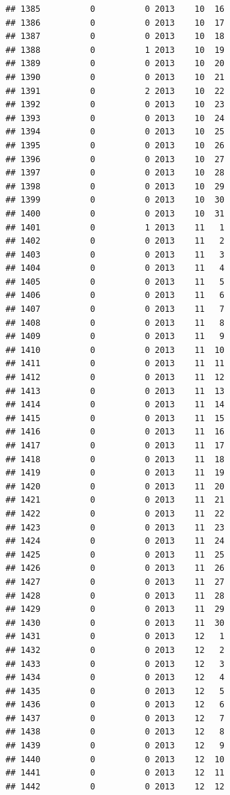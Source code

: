 \documentclass[
]{article}
\begin{document}
\begin{verbatim}
## 1385          0          0 2013    10  16
## 1386          0          0 2013    10  17
## 1387          0          0 2013    10  18
## 1388          0          1 2013    10  19
## 1389          0          0 2013    10  20
## 1390          0          0 2013    10  21
## 1391          0          2 2013    10  22
## 1392          0          0 2013    10  23
## 1393          0          0 2013    10  24
## 1394          0          0 2013    10  25
## 1395          0          0 2013    10  26
## 1396          0          0 2013    10  27
## 1397          0          0 2013    10  28
## 1398          0          0 2013    10  29
## 1399          0          0 2013    10  30
## 1400          0          0 2013    10  31
## 1401          0          1 2013    11   1
## 1402          0          0 2013    11   2
## 1403          0          0 2013    11   3
## 1404          0          0 2013    11   4
## 1405          0          0 2013    11   5
## 1406          0          0 2013    11   6
## 1407          0          0 2013    11   7
## 1408          0          0 2013    11   8
## 1409          0          0 2013    11   9
## 1410          0          0 2013    11  10
## 1411          0          0 2013    11  11
## 1412          0          0 2013    11  12
## 1413          0          0 2013    11  13
## 1414          0          0 2013    11  14
## 1415          0          0 2013    11  15
## 1416          0          0 2013    11  16
## 1417          0          0 2013    11  17
## 1418          0          0 2013    11  18
## 1419          0          0 2013    11  19
## 1420          0          0 2013    11  20
## 1421          0          0 2013    11  21
## 1422          0          0 2013    11  22
## 1423          0          0 2013    11  23
## 1424          0          0 2013    11  24
## 1425          0          0 2013    11  25
## 1426          0          0 2013    11  26
## 1427          0          0 2013    11  27
## 1428          0          0 2013    11  28
## 1429          0          0 2013    11  29
## 1430          0          0 2013    11  30
## 1431          0          0 2013    12   1
## 1432          0          0 2013    12   2
## 1433          0          0 2013    12   3
## 1434          0          0 2013    12   4
## 1435          0          0 2013    12   5
## 1436          0          0 2013    12   6
## 1437          0          0 2013    12   7
## 1438          0          0 2013    12   8
## 1439          0          0 2013    12   9
## 1440          0          0 2013    12  10
## 1441          0          0 2013    12  11
## 1442          0          0 2013    12  12

\end{verbatim}
\end{document}
